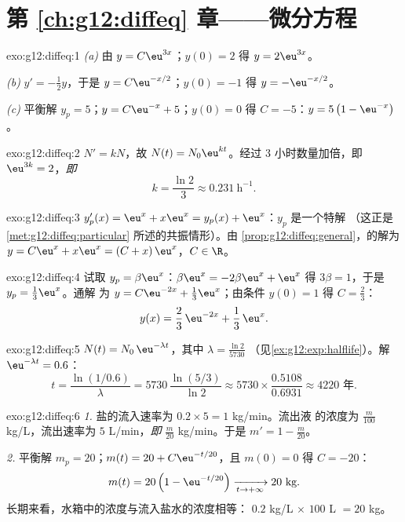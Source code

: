 \section*{第 \ref{ch:g12:diffeq} 章——微分方程}

\begin{solution}{exo:g12:diffeq:1}
\emph{(a)} 由 $y = C\eu^{3x}$；$y(0) = 2$ 得 $y = 2\eu^{3x}$。

\emph{(b)} $y' = -\frac12 y$，于是 $y = C\eu^{-x/2}$；$y(0) = -1$ 得
$y = -\eu^{-x/2}$。

\emph{(c)} 平衡解 $y_p = 5$；$y = C\eu^{-x} + 5$；$y(0) = 0$ 得
$C = -5$：$y = 5\left(1 - \eu^{-x}\right)$。
\end{solution}

\begin{solution}{exo:g12:diffeq:2}
$N' = kN$，故 $N(t) = N_0 \eu^{kt}$。经过 $3$ 小时数量加倍，即
$\eu^{3k} = 2$，\emph{即}
\[
k = \frac{\ln 2}{3} \approx 0.231\ \text{h}^{-1}.
\]
\end{solution}

\begin{solution}{exo:g12:diffeq:3}
$y_p'(x) = \eu^x + x\eu^x = y_p(x) + \eu^x$：$y_p$ 是一个特解
（这正是 \cref{met:g12:diffeq:particular} 所述的共振情形）。由
\cref{prop:g12:diffeq:general}，的解为
$y = C\eu^{x} + x\eu^{x} = (C + x)\,\eu^x$，$C \in \R$。
\end{solution}

\begin{solution}{exo:g12:diffeq:4}
试取 $y_p = \beta\eu^x$：$\beta\eu^x = -2\beta\eu^x + \eu^x$ 得
$3\beta = 1$，于是 $y_p = \frac13\eu^x$。通解
为 $y = C\eu^{-2x} + \frac13\eu^{x}$；由条件 $y(0) = 1$ 得
$C = \frac23$：
\[
y(x) = \frac{2}{3}\,\eu^{-2x} + \frac{1}{3}\,\eu^{x}.
\]
\end{solution}

\begin{solution}{exo:g12:diffeq:5}
$N(t) = N_0\,\eu^{-\lambda t}$，其中 $\lambda = \frac{\ln 2}{5730}$
（见\cref{ex:g12:exp:halflife}）。解 $\eu^{-\lambda t} = 0.6$：
\[
t = \frac{\ln(1/0.6)}{\lambda} = 5730\,\frac{\ln(5/3)}{\ln 2}
\approx 5730 \times \frac{0.5108}{0.6931} \approx 4220 \text{ 年}.
\]
\end{solution}

\begin{solution}{exo:g12:diffeq:6}
\emph{1.} 盐的流入速率为 $0.2 \times 5 = 1$ kg/min。流出液
的浓度为 $\frac{m}{100}$ kg/L，流出速率为 $5$ L/min，\emph{即} $\frac{m}{20}$
kg/min。于是 $m' = 1 - \frac{m}{20}$。

\emph{2.} 平衡解 $m_p = 20$；$m(t) = 20 + C\eu^{-t/20}$，且
$m(0) = 0$ 得 $C = -20$：
\[
m(t) = 20\left(1 - \eu^{-t/20}\right) \xrightarrow[t\to+\infty]{} 20 \text{ kg}.
\]
长期来看，水箱中的浓度与流入盐水的浓度相等：
$0.2$ kg/L $\times$ $100$ L $= 20$ kg。
\end{solution}

